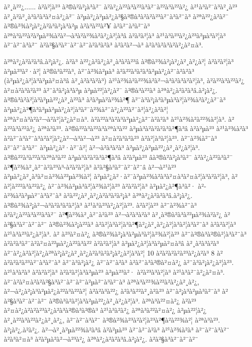 à²¸à²²¿...... à²à²¦à²³ à²®à²à²¡à³à²¯ à²à²¿à²²à³à²²à³à²¯à²²à³à²²à²¿ à²¹à³à²¯à³à²¸à²³ à²¸à²à²¸à³à²à³à²¤à²¿à²¯ à²µà²¿à²µà²¿à²§à²®à³à²à²à²³à²¨à³à²¨à³ à²ªà²²¿à²à²¯ à²®à²¾à²¡à²¿à²à³à²¡à³à²µ à²à³à²²à²¥ à²à²¨à³à²¨à³ à²ªà³à²²à²à²µà²¾à²à²¬à³à²à²¾à²à²¿à²¦à³â à²à²à²¦à³ à²¹à³à²³à²¿à²³à²µà³à²¦à³ à²¨à²¨à³à²¨ à²à²§à³à²¯à²¯à²¨à²à³à²à³ à²à²à²¬à³ à²à³à²à³à²à²¿à²¤à³. 

à²ªà²¿à²à²à³â.à²¡à²¿. à²à³ à²²¿à²à²¿à²¸à³à²à²³â à²®à²¾à²¡à²¿à²¸à²¿à²¦ à²à²à²¦à³ à²µà²³à²·à²¦ à²®à³à²²à³, à²¨à²¾à²µà³ à²à²²à³à²à³à²µà²¿à²¯à²à²à³ (à²µà²¿à²¦à³à²µà²¤à³â à²¸à²­à³à²à³) à²¹à²¾à²à²²¾à²à²¬à³à²à³à²à²¦à³, à²à²²à³à²²à²¿ à²¤à²à³à²à²³ à²¨à³à²¡à³à²µ à²µà²²¦à²¿à²¯ à²®à³à²²à³ à²ªà²¿à²à²à³â.à²¡à²¿. à²®à³à²à²¦à³à²µà²²¿à²¸à²²à³ à²à²µà²à²¾à²¶ à²¨à³à²¡à³à²µà³à²¦à²¾à²à²¿à²¯à³ à²µà²¿à²¶à³à²µà²µà²¿à²¦à³à²¯à²¾à²¨à²¿à²²à²¯à²¦à²¿à²à²¦ à²ªà²¤à³à²\circ à²¬à²à²¦à²¿à²¤à³. à²à²²à³à²à³à²µà²¿à²¯à²à²à³ à²¹à²¾à²à²²¾à²¦à³. à²à²²à³à²²à²¿ à²ªà³à²³. à²®à²²à³à²²à³à²ªà³à²² à²µà³à²à²à²à³à²¶à³â à²à²µà²³ à²¹à²¾à²à³ à²à²¨à³à²¨à³à²à²¦à²¿à²¬à³à²¬à²³ à²¤à²à³à²à²³ à²à²¦à³à²¦à²³. à²¨à²¾à²¨à³ à²¨à²¨à³à²¨ à²µà²¿à²·à²¯à²¦ à²¬à²à³à²à³ à²µà²¿à²µà²²¿à²¸à²¿à²¦à³. à²®à²²à³à²²à³à²ªà³à²² à²µà³à²à²à³à²¶à³â à²à²µà²³ âà²®à²à²¡à³à²¯ à²à²¿à²²à³à²¯ à²¶à²¾à²¸à²¨à²à²³à³-à²à²à²¦à³ à²à²§à³à²¯à²¯à²¨â à²¬à²¹à²³ à²µà²¿à²¸à³à²¤à²¾à²²µà²¾à²¦ à²µà²¿à²·à²¯à²µà²¾à²à³à²¤à³à²¤à²¦à³à²à²¦à³, à²à²¦à²²²à³à²²à²¿ à²¯à²¾à²µà³à²¦à²¾à²¦à²³ à²à²à²¦à³ à²µà²¿à²¶à³à²· à²­à²¾à²à²µà²¨à³à²¨à³ à²à²²¿à²¸à²¿à²à³à²à²¡à³ à²ªà²¿à²à²à³â.à²¡à²¿. à²®à²¾à²¡à²¬à³à²à³à²à²¦à³ à²¹à³à²³à²¿à²¦à²³. à²à²¦à²³ à²¨à²¾à²¨à³ à²à²¿à²²à³à²²à³à²¯ à²¶à²¾à²¸à²¨à²à²³ à²¬à²à³à²à³ à²¸à²®à²à³à²²µà²¾à²à²¿ à²à²§à³à²¯à²¯à²¨ à²®à²¾à²¡à²²à³ à²à²¦à³à²¦à³à²¶à²¿à²¸à²¿à²¦à³à²¦à³à²¨à³ à²à²à²¦à³ à²¹à³à²³à²¿à²¦à³. à² à²³à²¤à²¿ à²®à²¾à²¡à³à²µà³à²¦à²¾à²¦à²³ à²¨à²®à³à²®à²¦à³à²¨à³ à²à²­à³à²¯à²à²¤à²²µà²¿à²²à³à²² à²à²à²¦à³ à²µà²¿à²¦à³à²µà²¤à³â à²¸à²­à³à²à³ à²¨à²¿à²à²¦à²¿à²ªà²¡à²¿à²¸à²¿à²à³à²à²¡à²¿à²¦à³à²¦ 10 à²à²à²à²à²³à²¿à²à³ 8 à²à²à²à²à²³à²¨à³à²¨à³ à²¨à³à²¡à²¿ à²¨à²¨à²à³ à²à²¨à³à²®à²¤à²¿ à²¨à³à²¡à²¿à²¦à²³. à²¹à³à²à³ à²à²à²¦à³ à²à²à²¦à³à²µà²³ à²µà²³à²· à²à²³à³à²¦à³ à²¹à³à²¯à²¿à²¤à³. à²¨à²à²¤à²\circ à²à²§à³à²¯à²¯à²¨à²µà²¨à³à²¨à³ à²ªà³à²²¾à²²à²­à²¿à²¸à²¿, à²¬à²¿à²¡à³à²µà²¿à²²à³à²²à²¦ à²à²à³à²²¿ à²à³à²²à²¸à²à²³ à²¨à²¡à³à²µà³à²¯à³ à²à²§à³à²¯à²¯à²¨ à²®à³à²à²¦à³à²µà²²¿à²¸à²¿à²¦à³. à²ªà³à²²¤à²¿ à²à²³ à²¤à²¿à²à²à²³à²¿à²à³à²®à³à²®à³ à²¹à³à²à²¿ à²ªà³à²²à²¤à²¿ à²µà²²¦à²¿ à²¸à²²à³à²²à²¿à²¸à²¿, à²¨à²¨à³à²¨ à²®à²¾à²³à²à²¦à²³à²¶à²à²²¾à²¦ à²ªà³à²³. à²¡à²¿.à²à²¿. à²¬à²¸à²µà²²¾à²à³â à²à²µà²³ à²¨à²¨à²à³ à²¹à²¾à²à³ à²¨à²¨à³à²¨ à²à³à²¤à³ à²à²µà²\circ à²¬à²³à²¿ à²ªà²¿à²à²à³â.à²¡à²¿. à²à²§à³à²¯à²¯à²¨ 